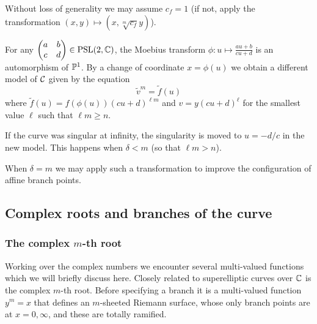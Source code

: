 \documentclass[main.tex]{subfiles}
\begin{document}
  \begin{rmk}
   Without loss of generality we may assume $c_f = 1$ (if not, apply the transformation $(x,y) \mapsto (x,\sqrt[m]{c_f}y)$).
  \end{rmk}
  \begin{rmk}
      \label{rmk:moebius}
      For any $\begin{pmatrix}a&b\\c&d\end{pmatrix}\in\PSl(2,\C)$,
      the Moebius transform $\phi:u\mapsto \frac{au+b}{cu+d}$ is an automorphism
      of $\P^1$. By a change of coordinate $x=\phi(u)$ we obtain a different model of $\cu$
      given by the equation
      \begin{equation*}
          \tilde v^m = \tilde f(u)
      \end{equation*}
      where $\tilde f(u)=f(\phi(u))(cu+d)^{\ell m}$ and $v=y(cu+d)^\ell$ for
      the smallest value $\ell$ such that $\ell m\geq n$.

      If the curve was singular at infinity, the singularity is moved to $u=-d/c$ in the new model.
      This happens when $\delta < m$ (so that $\ell m > n$).

  When $\delta=m$ we may apply such a transformation to improve the configuration
  of affine branch points.
  \end{rmk}

  \subsection{Complex roots and branches of the curve}\label{subsec:roots_branches}

  \subsubsection{The complex $m$-th root}

  Working over the complex numbers we encounter several multi-valued functions
  which we will briefly discuss here. Closely related to superelliptic
  curves over $\C$ is the complex $m$-th root.
  Before specifying a branch it is a multi-valued function $y^m = x$
  that defines an $m$-sheeted Riemann surface, whose only branch points
  are at $x = 0,\infty$, and these are totally ramified.
\end{document}
